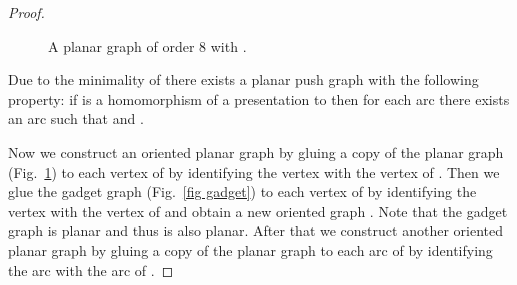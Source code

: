 \documentclass[10pt]{article}
\begin{document}
\begin{proof}
\begin{figure}

\caption{A planar graph  of order 8 with .}\label{fig push planarmax}
\end{figure}


Due to the minimality of  there exists a planar push graph  with the following property: 
if  is a homomorphism of a presentation  to   then 
 for each arc  there exists an arc 
 such that  and . 




Now we construct an oriented planar graph  by gluing a copy of the planar graph  (Fig.~\ref{fig push planarmax})
to each vertex of  by identifying the vertex with the vertex  of .
Then we glue the gadget graph   (Fig.~\ref{fig gadget})
to each vertex of  by identifying the vertex with the vertex  of  and obtain a new oriented graph .
Note that the gadget graph  is planar and thus   is also planar. 
After that we construct another oriented planar graph  by gluing a copy of the planar graph  
to each arc of  by identifying the arc with the arc  of .



\end{proof}
\end{document}
